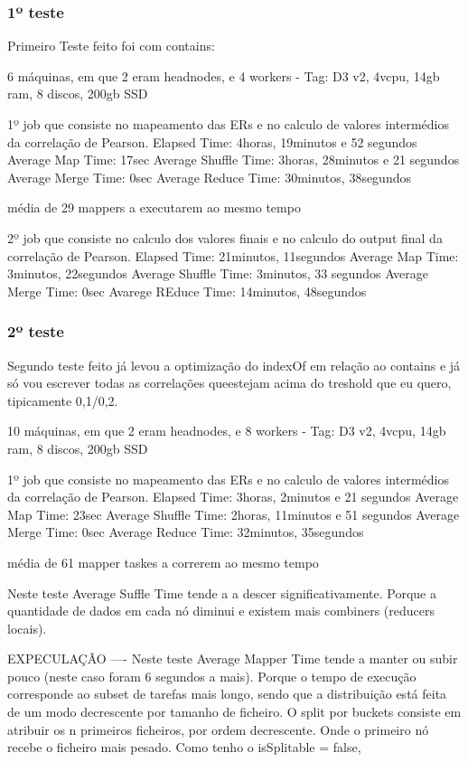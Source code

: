 \subsubsection{1º teste}
Primeiro Teste feito foi com contains:

6 máquinas, em que 2 eram headnodes, e 4 workers - Tag: D3 v2, 4vcpu, 14gb ram, 8 discos, 200gb SSD

1º job que consiste no mapeamento das ERs e no calculo de valores intermédios da correlação de Pearson.
Elapsed Time: 4horas, 19minutos e 52 segundos
Average Map Time: 17sec
Average Shuffle Time: 3horas, 28minutos e 21 segundos
Average Merge Time: 0sec
Average Reduce Time: 30minutos, 38segundos

média de 29 mappers a executarem ao mesmo tempo

2º job que consiste no calculo dos valores finais e no calculo do output final da correlação de Pearson.
Elapsed Time: 21minutos, 11segundos
Average Map Time: 3minutos, 22segundos
Average Shuffle Time: 3minutos, 33 segundos
Average Merge Time: 0sec
Avarege REduce Time: 14minutos, 48segundos



\subsubsection{2º teste}
Segundo teste feito já levou a optimização do indexOf em relação ao contains e já só vou escrever todas as correlações queestejam acima do treshold que eu quero, tipicamente 0,1/0,2.

10 máquinas, em que 2 eram headnodes, e 8 workers - Tag: D3 v2, 4vcpu, 14gb ram, 8 discos, 200gb SSD

1º job que consiste no mapeamento das ERs e no calculo de valores intermédios da correlação de Pearson.
Elapsed Time: 3horas, 2minutos e 21 segundos
Average Map Time: 23sec
Average Shuffle Time: 2horas, 11minutos e 51 segundos
Average Merge Time: 0sec
Average Reduce Time: 32minutos, 35segundos

média de 61 mapper taskes a correrem ao mesmo tempo

Neste teste Average Suffle Time tende a a descer significativamente. Porque a quantidade de dados em cada nó diminui e existem mais combiners (reducers locais). 


EXPECULAÇÃO ---- Neste teste Average Mapper Time tende a manter ou subir pouco (neste caso foram 6 segundos a mais). Porque o tempo de execução corresponde ao subset de tarefas mais longo, sendo que a distribuição está feita de um modo decrescente por tamanho de ficheiro. O split por buckets consiste em atribuir os n primeiros ficheiros, por ordem decrescente. Onde o primeiro nó recebe o ficheiro mais pesado. Como tenho o isSplitable = false, 

